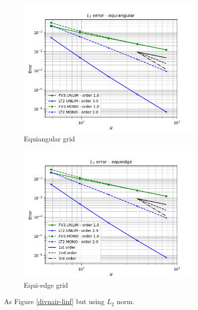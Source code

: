 \documentclass[preprint,12pt]{elsarticle}
\begin{document}
\begin{linenumbers}
\begin{figure}[!htb]
	\centering
	\begin{subfigure}{0.45\textwidth}
		\centering
		\includegraphics[width=1.1\linewidth]{l2error_tc-6_alpha0.equiangular}
		\caption{Equiangular grid\label{divnair-equiangular-2}}
	\end{subfigure}
	\begin{subfigure}{0.45\textwidth}
	\centering
	\includegraphics[width=1.1\linewidth]{l2error_tc-6_alpha0.equiedge}
  	\caption{Equi-edge grid\label{divnair-equiedge-l2}}
    \end{subfigure}
	\caption{As Figure \ref{divnair-linf} but using $L_2$ norm.
		\label{divnair-l2}}
\end{figure}


\end{linenumbers}
\end{document}
